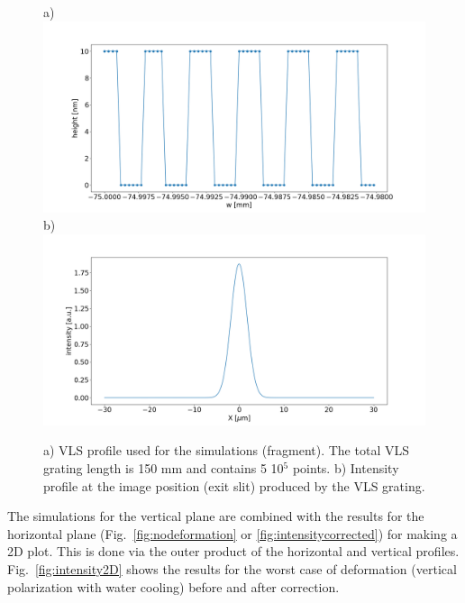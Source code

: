 \documentclass{iucr}              %
\begin{document}
  \begin{figure}
  \begin{center}

  a)\\
  \includegraphics[width=1\textwidth]{figures/grating.png} 
  b) \\
   \includegraphics[width=1\textwidth]{figures/intensitygrating.png}


  \end{center}
  \caption
  { \label{fig:grating} 
a) VLS profile used for the simulations (fragment). The total VLS grating length is 150 mm and contains 5 10$^5$ points. b) Intensity profile at the image position (exit slit) produced by the VLS grating.   
}
  \end{figure}


The simulations for the vertical plane are combined with the results for the horizontal plane (Fig.~\ref{fig:nodeformation} or \ref{fig:intensitycorrected}) for making a 2D plot. This is done via the outer product of the horizontal and vertical profiles. Fig.~\ref{fig:intensity2D} shows the results for the worst case of deformation (vertical polarization with water cooling) before and after correction. 
\end{document}
